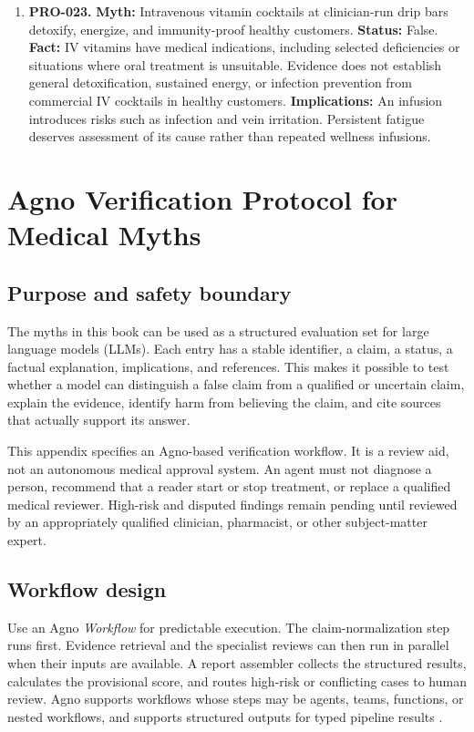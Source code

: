 \documentclass[11pt,oneside]{book}
\begin{document}
\begin{enumerate}[leftmargin=0pt,labelwidth=0pt,labelsep=0pt,itemindent=0pt]
\item[] \textbf{PRO-023.} \textbf{Myth:} Intravenous vitamin cocktails at clinician-run drip bars detoxify, energize, and immunity-proof healthy customers.\newline
\textbf{Status:} False.\newline
\textbf{Fact:} IV vitamins have medical indications, including selected deficiencies or situations where oral treatment is unsuitable. Evidence does not establish general detoxification, sustained energy, or infection prevention from commercial IV cocktails in healthy customers. \cite{ref289}\newline
\textbf{Implications:} An infusion introduces risks such as infection and vein irritation. Persistent fatigue deserves assessment of its cause rather than repeated wellness infusions.
\end{enumerate}

\appendix
\chapter{Agno Verification Protocol for Medical Myths}

\section{Purpose and safety boundary}

The myths in this book can be used as a structured evaluation set for large language models (LLMs). Each entry has a stable identifier, a claim, a status, a factual explanation, implications, and references. This makes it possible to test whether a model can distinguish a false claim from a qualified or uncertain claim, explain the evidence, identify harm from believing the claim, and cite sources that actually support its answer.

This appendix specifies an Agno-based verification workflow. It is a review aid, not an autonomous medical approval system. An agent must not diagnose a person, recommend that a reader start or stop treatment, or replace a qualified medical reviewer. High-risk and disputed findings remain pending until reviewed by an appropriately qualified clinician, pharmacist, or other subject-matter expert.

\section{Workflow design}

Use an Agno \emph{Workflow} for predictable execution. The claim-normalization step runs first. Evidence retrieval and the specialist reviews can then run in parallel when their inputs are available. A report assembler collects the structured results, calculates the provisional score, and routes high-risk or conflicting cases to human review. Agno supports workflows whose steps may be agents, teams, functions, or nested workflows, and supports structured outputs for typed pipeline results \cite{ref213,ref214}.
\end{document}
